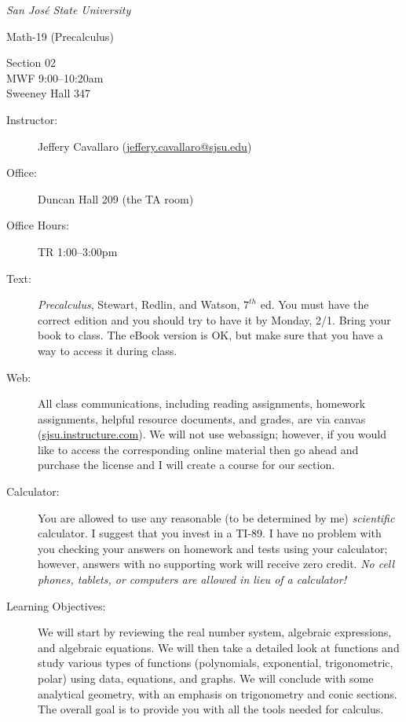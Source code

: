\documentclass[letterpaper,12pt,fleqn]{article}
\begin{document}
\begin{center}
\emph{San Jos\'{e} State University}

\Large{Math-19 (Precalculus)}\normalsize

Section 02 \\
MWF 9:00--10:20am \\
Sweeney Hall 347
\end{center}

\vspace{0.5in}

\begin{description}

\item[Instructor:] Jeffery Cavallaro (\url{jeffery.cavallaro@sjsu.edu})

\item[Office:] Duncan Hall 209 (the TA room)

\item[Office Hours:] TR 1:00--3:00pm

\item[Text:] \emph{Precalculus}, Stewart, Redlin, and Watson, $7^{th}$ ed. You
    must have the correct edition and you should try to have it by Monday, 2/1.
    Bring your book to class. The eBook version is OK, but make sure that you
    have a way to access it during class.

\item[Web:] All class communications, including reading assignments, homework
    assignments, helpful resource documents, and grades, are via canvas
    (\url{sjsu.instructure.com}). We will not use webassign; however, if you
    would like to access the corresponding online material then go ahead and
    purchase the license and I will create a course for our section.

\item[Calculator:] You are allowed to use any reasonable (to be determined by
    me) \emph{scientific} calculator. I suggest that you invest in a TI-89. I
    have no problem with you checking your answers on homework and tests using
    your calculator; however, answers with no supporting work will receive zero
    credit. \emph{No cell phones, tablets, or computers are allowed in lieu
    of a calculator!}

\item[Learning Objectives:] We will start by reviewing the real number system,
    algebraic expressions, and algebraic equations. We will then take a
    detailed look at functions and study various types of functions
    (polynomials, exponential, trigonometric, polar) using data, equations,
    and graphs. We will conclude with some analytical geometry, with an
    emphasis on trigonometry and conic sections. The overall goal is to
    provide you with all the tools needed for calculus.


\end{description}
\end{document}
